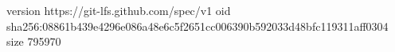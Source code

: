 version https://git-lfs.github.com/spec/v1
oid sha256:08861b439e4296e086a48e6c5f2651cc006390b592033d48bfc119311aff0304
size 795970
